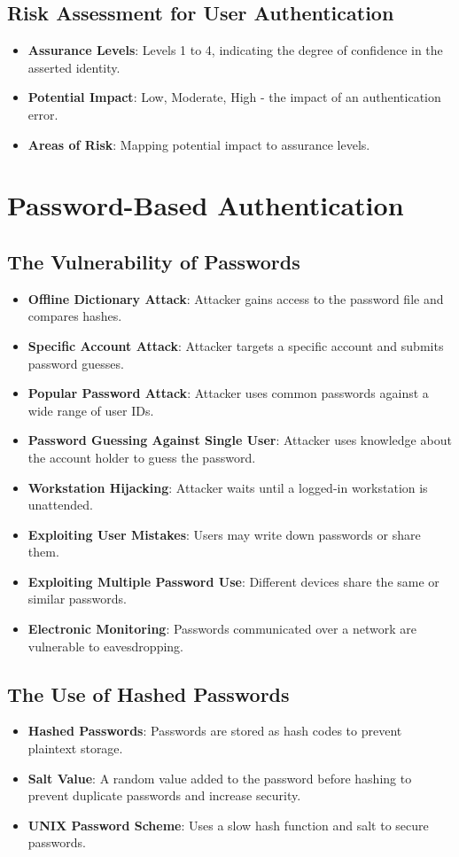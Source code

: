 \documentclass{article}
\begin{document}
\subsection{Risk Assessment for User Authentication}
\begin{itemize}
    \item \textbf{Assurance Levels}: Levels 1 to 4, indicating the degree of confidence in the asserted identity.
    \item \textbf{Potential Impact}: Low, Moderate, High - the impact of an authentication error.
    \item \textbf{Areas of Risk}: Mapping potential impact to assurance levels.
\end{itemize}

\section{Password-Based Authentication}
\subsection{The Vulnerability of Passwords}
\begin{itemize}
    \item \textbf{Offline Dictionary Attack}: Attacker gains access to the password file and compares hashes.
    \item \textbf{Specific Account Attack}: Attacker targets a specific account and submits password guesses.
    \item \textbf{Popular Password Attack}: Attacker uses common passwords against a wide range of user IDs.
    \item \textbf{Password Guessing Against Single User}: Attacker uses knowledge about the account holder to guess the password.
    \item \textbf{Workstation Hijacking}: Attacker waits until a logged-in workstation is unattended.
    \item \textbf{Exploiting User Mistakes}: Users may write down passwords or share them.
    \item \textbf{Exploiting Multiple Password Use}: Different devices share the same or similar passwords.
    \item \textbf{Electronic Monitoring}: Passwords communicated over a network are vulnerable to eavesdropping.
\end{itemize}

\subsection{The Use of Hashed Passwords}
\begin{itemize}
    \item \textbf{Hashed Passwords}: Passwords are stored as hash codes to prevent plaintext storage.
    \item \textbf{Salt Value}: A random value added to the password before hashing to prevent duplicate passwords and increase security.
    \item \textbf{UNIX Password Scheme}: Uses a slow hash function and salt to secure passwords.
\end{itemize}
\end{document}
